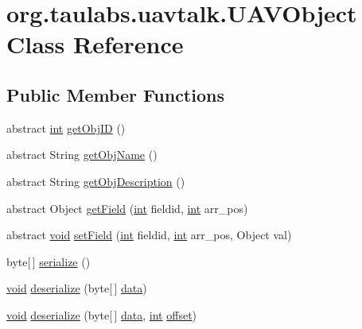 \hypertarget{classorg_1_1taulabs_1_1uavtalk_1_1_u_a_v_object}{\section{org.\-taulabs.\-uavtalk.\-U\-A\-V\-Object Class Reference}
\label{classorg_1_1taulabs_1_1uavtalk_1_1_u_a_v_object}
}
\subsection*{Public Member Functions}
\begin{DoxyCompactItemize}
\item 
abstract \hyperlink{ioapi_8h_a787fa3cf048117ba7123753c1e74fcd6}{int} \hyperlink{classorg_1_1taulabs_1_1uavtalk_1_1_u_a_v_object_a9b1dc8d4596067de02880ffdf8473ae1}{get\-Obj\-I\-D} ()
\item 
abstract String \hyperlink{classorg_1_1taulabs_1_1uavtalk_1_1_u_a_v_object_acc8f62ae1a0b435d452ab6f02d05c522}{get\-Obj\-Name} ()
\item 
abstract String \hyperlink{classorg_1_1taulabs_1_1uavtalk_1_1_u_a_v_object_a73e7450e50b592456c09631410cd7977}{get\-Obj\-Description} ()
\item 
abstract Object \hyperlink{classorg_1_1taulabs_1_1uavtalk_1_1_u_a_v_object_a565f816432e849b2085b916985569470}{get\-Field} (\hyperlink{ioapi_8h_a787fa3cf048117ba7123753c1e74fcd6}{int} fieldid, \hyperlink{ioapi_8h_a787fa3cf048117ba7123753c1e74fcd6}{int} arr\-\_\-pos)
\item 
abstract \hyperlink{group___u_a_v_objects_plugin_ga444cf2ff3f0ecbe028adce838d373f5c}{void} \hyperlink{classorg_1_1taulabs_1_1uavtalk_1_1_u_a_v_object_adad546b53ff86f3f2c31a7288bbc4a0e}{set\-Field} (\hyperlink{ioapi_8h_a787fa3cf048117ba7123753c1e74fcd6}{int} fieldid, \hyperlink{ioapi_8h_a787fa3cf048117ba7123753c1e74fcd6}{int} arr\-\_\-pos, Object val)
\item 
byte\mbox{[}$\,$\mbox{]} \hyperlink{classorg_1_1taulabs_1_1uavtalk_1_1_u_a_v_object_a8751ce3ec9736eb071465670d10f6cdc}{serialize} ()
\item 
\hyperlink{group___u_a_v_objects_plugin_ga444cf2ff3f0ecbe028adce838d373f5c}{void} \hyperlink{classorg_1_1taulabs_1_1uavtalk_1_1_u_a_v_object_a395209efe65f8930125e3039da4018f9}{deserialize} (byte\mbox{[}$\,$\mbox{]} \hyperlink{glext_8h_a8850df0785e6fbcc2351af3b686b8c7a}{data})
\item 
\hyperlink{group___u_a_v_objects_plugin_ga444cf2ff3f0ecbe028adce838d373f5c}{void} \hyperlink{classorg_1_1taulabs_1_1uavtalk_1_1_u_a_v_object_abdc532e4be9759f978d5dbf9ec0f965f}{deserialize} (byte\mbox{[}$\,$\mbox{]} \hyperlink{glext_8h_a8850df0785e6fbcc2351af3b686b8c7a}{data}, \hyperlink{ioapi_8h_a787fa3cf048117ba7123753c1e74fcd6}{int} \hyperlink{glext_8h_ae1b92ae085ddef4b1cdca7d749339fb0}{offset})

\end{DoxyCompactItemize}
